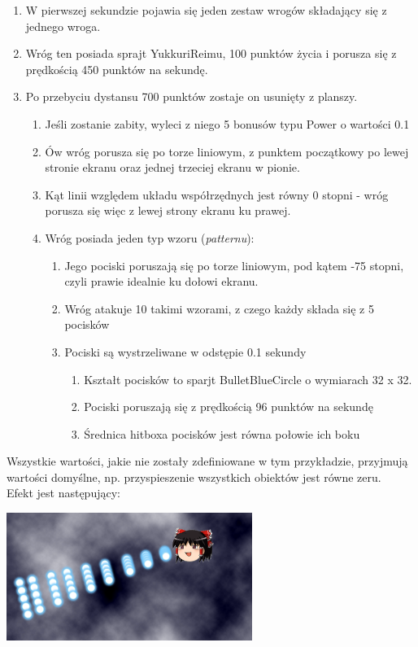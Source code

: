 		\begin{enumerate}
			\item W pierwszej sekundzie pojawia się jeden zestaw wrogów składający się z jednego wroga.
			\item Wróg ten posiada sprajt YukkuriReimu, 100 punktów życia i porusza się z prędkością 450 punktów na sekundę.
			\item Po przebyciu dystansu 700 punktów zostaje on usunięty z planszy.
			\begin{enumerate}
				\item Jeśli zostanie zabity, wyleci z niego 5 bonusów typu Power o wartości 0.1
				\item Ów wróg porusza się po torze liniowym, z punktem początkowy po lewej stronie ekranu oraz jednej trzeciej ekranu w pionie.
				\item Kąt linii względem układu współrzędnych jest równy 0 stopni - wróg porusza się więc z lewej strony ekranu ku prawej.
				\item Wróg posiada jeden typ wzoru (\emph{patternu}):
				\begin{enumerate}
					\item Jego pociski poruszają się po torze liniowym, pod kątem -75 stopni, czyli prawie idealnie ku dołowi ekranu.
					\item Wróg atakuje 10 takimi wzorami, z czego każdy składa się z 5 pocisków
					\item Pociski są wystrzeliwane w odstępie 0.1 sekundy
					\begin{enumerate}
						\item Kształt pocisków to sparjt BulletBlueCircle o wymiarach 32 x 32.
						\item Pociski poruszają się z prędkością 96 punktów na sekundę
						\item Średnica hitboxa pocisków jest równa połowie ich boku
					\end{enumerate}
				\end{enumerate}
			\end{enumerate}
		\end{enumerate}
		Wszystkie wartości, jakie nie zostały zdefiniowane w tym przykładzie, przyjmują wartości domyślne, np. przyspieszenie wszystkich obiektów jest równe zeru.\\
		Efekt jest następujący:
		\begin{center}
			\includegraphics[width=0.6\textwidth]{./images/test1}
		\end{center}
		
